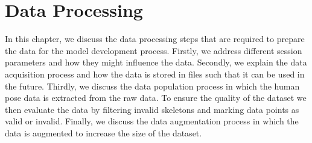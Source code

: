 \chapter{Data Processing}
\label{sec:data_processing}

In this chapter, we discuss the data processing steps that are required to prepare the data for the model development process. Firstly, we address different session parameters and how they might influence the data. Secondly, we explain the data acquisition process and how the data is stored in files such that it can be used in the future. Thirdly, we discuss the data population process in which the human pose data is extracted from the raw data. To ensure the quality of the dataset we then evaluate the data by filtering invalid skeletons and marking data points as valid or invalid. Finally, we discuss the data augmentation process in which the data is augmented to increase the size of the dataset.





